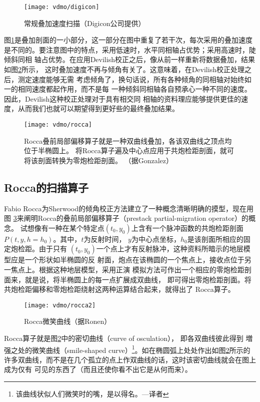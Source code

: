 \begin{figure}[H]
\centering
\texttt{[image: vdmo/digicon]}
\caption[digicon]{常规叠加速度扫描（Digicon公司提供）}
\label{fig:vdmo/digicon}
\end{figure}

图\ref{fig:vdmo/digicon}是叠加剖面的一小部分，这一部分在图中重复了若干次，每次采用的叠加速度
是不同的。要注意图中的特点，采用低速时，水平同相轴占优势；采用高速时，陡倾斜同相
轴占优势。在应用Devilish校正之后，像从前一样重新将数据叠加，结果如图\ref{fig:vdmo/rocca}所示，
这时叠加速度不再与倾角有关了。这意味着，在Devilish校正处理之后，测定速度能够无需
考虑倾角了，换句话说，所有各种倾角的同相轴对始终如一的相同速度都起作用，而不是每
一种倾斜同相轴各自预承心一种不同的速度。因此，Devilish这种校正处理对于具有相交同
相轴的资料理应能够提供更佳的速度，从而我们也就可以期望得到更好些的最终叠加结果。

\begin{figure}[H]
\centering
\texttt{[image: vdmo/rocca]}
\caption[rocca]{Rocca叠前局部偏移算子就是一种双曲线叠加，各该双曲线之顶点均位于半椭圆上。
将Rocca算子遍及中心点应用于共炮检距剖面，就可将该剖面转换为零炮检距剖面。
（据Gonzalez）}
\label{fig:vdmo/rocca}
\end{figure}

\subsection{Rocca的扫描算子}
\label{sec:3.6.2}

Fabio Rocca为Sherwood的倾角校正方法建立了一种概念清晰明确的摸型，现在用图
\ref{fig:vdmo/rocca2}来阐明Rocca的叠前局部偏移算子（prestack partial-migration operator）的概念。
试想像有一种在某个特定点$(t_0,y_0)$上含有一个脉冲函数的共炮检距剖面$P(t,y,h=h_0)$。其中，$t$为反射时间，
$y$为中心点坐标，$h_0$是该剖面所相应的固定炮检距。由于只有
$(t_0,y_0)$一个点上才有反射脉冲，这种资料所暗示的地层模型应是一个形状如半椭圆的反
射面，炮点在该椭圆的一个焦点上，接收点位于另一焦点上。根据这种地层模型，采用正演
模拟方法可作出一个相应的零炮检距剖面来，就是说，将半椭圆上的每一点扩展成双曲线，
即可得出零炮检距剖面。将共炮检距偏移和零炮检距绕射这两种运算结合起来，就得出了
Rocca算子。

\begin{figure}[H]
\centering
\texttt{[image: vdmo/rocca2]}
\caption[rocca2]{Rocca微笑曲线（据Ronen）}
\label{fig:vdmo/rocca2}
\end{figure}

Rocca算子就是图\ref{fig:vdmo/rocca}中的密切曲线（curve of osculation），
即各双曲线彼此得到
増强之处的微笑曲线（smile-shaped curve）\footnote{
该曲线状似人们微笑时的嘴，是以得名。---译者
}。如在椭圆弧上处处作出如图\ref{fig:vdmo/rocca}所示的
许多双曲线，而不是在几个孤立的点上作双曲线的话，这时该密切曲线就会在图上成为仅有
可见的东西了（而且还使你看不出它是从何而来）。


